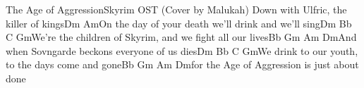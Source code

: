 \documentclass[a5paper,9pt]{article}
\begin{document}
\begin{song}{The Age of Aggression}{Skyrim OST (Cover by Malukah)}
         Down with Ulfric, the killer of kings\newline                                   Dm                      Am\newline                            On the day of your death we'll drink and we'll sing\newline                                      Dm          Bb             C             Gm\newline                            We're the children of Skyrim, and we fight all our lives\newline                                     Bb        Gm           Am        Dm\newline                            And when Sovngarde beckons everyone of us dies\newline                                                                                       Dm           Bb            C             Gm\newline                            We drink to our youth, to the days come and gone\newline                                    Bb        Gm         Am         Dm\newline                            for the Age of Aggression is just about done\newline                    \end{song}
    
\end{document}
